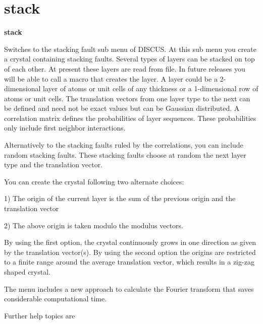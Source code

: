 \section{stack}
{\bf stack \par }
\par
\vspace{3pt}
Switches to the stacking fault sub menu of DISCUS. 
At this sub menu you create a crystal containing stacking faults. 
Several types of layers can be stacked on top of each other. At present 
these layers are read from file. In future releases you will be able to 
call a macro that creates the layer. A layer could be a 2-dimensional 
layer of atoms or unit cells of any thickness or a 1-dimensional row 
of atoms or unit cells. 
The translation vectors from one layer type to the next can be defined 
and need not be exact values but can be Gaussian distributed. 
A correlation matrix defines the probabilities of layer sequences. 
These probabilities only include first neighbor interactions. 
\par
Alternatively to the stacking faults ruled by the correlations, you 
can include random stacking faults. These stacking faults choose at 
random the next layer type and the translation vector. 
\par
You can create the crystal following two alternate choices: 
\par
1) The origin of the current layer is the sum of the previous origin 
   and the translation vector 
\par
2) The above origin is taken modulo the modulus vectors. 
\par
By using the first option, the crystal continuously grows in one 
direction as given by the translation vector(s). By using the second 
option the origins are restricted to a finite range around the 
average translation vector, which results in a zig-zag shaped crystal. 
\par
The menu includes a new approach to calculate the Fourier transform that 
saves considerable computational time. 
\par
Further help topics are 
\par
